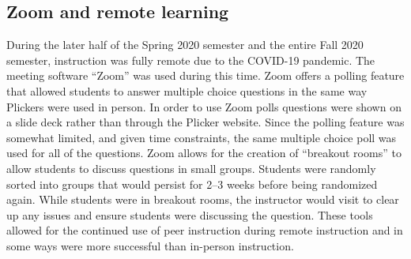 \documentclass[12pt]{article}
\begin{document}
\subsection{Zoom and remote learning}
During the later half of the Spring 2020 semester and the entire Fall 2020 semester, instruction was fully remote due to the COVID-19 pandemic. The meeting software ``Zoom''  was used during this time. Zoom offers a polling feature that allowed students to answer multiple choice questions in the same way Plickers were used in person. In order to use Zoom polls questions were shown on a slide deck rather than through the Plicker website. Since the polling feature was somewhat limited, and given time constraints, the same multiple choice poll was used for all of the questions. 
Zoom allows for the creation of ``breakout rooms'' to allow students to discuss questions in small groups. Students were randomly sorted into groups that would persist for 2–3 weeks before being randomized again. While students were in breakout rooms, the instructor would visit to clear up any issues and ensure students were discussing the question. These tools allowed for the continued use of peer instruction during remote instruction and in some ways were more successful than in-person instruction.
\end{document}
